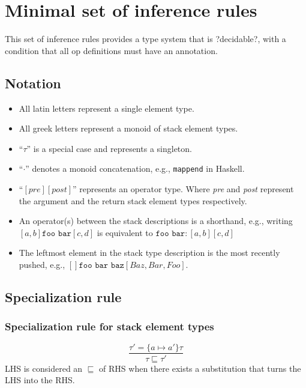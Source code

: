 \documentclass{article}
\newcommand{\op}[3]{[#1] \texttt{#2} [#3]}
\begin{document}
\section*{Minimal set of inference rules}
This set of inference rules provides a type system that is ?decidable?,
with a condition that all op definitions must have an annotation.

\subsection*{Notation}

\begin{itemize}
\item All latin letters represent a single element type.
\item All greek letters represent a monoid of stack element types.
\item ``$\tau$'' is a special case and represents a singleton.
\item ``$\cdot$'' denotes a monoid concatenation, e.g.,
  \texttt{mappend} in Haskell.
\item ``$\op{\textit{pre}}{}{\textit{post}}$'' represents an operator
  type. Where \textit{pre} and \textit{post} represent the argument
  and the return stack element types respectively.
\item An operator(s) between the stack descriptions is a shorthand,
  e.g., writing $\op{a, b}{foo bar}{c, d}$ is equivalent to
  $\texttt{foo bar} : \op{a, b}{}{c, d}$
\item The leftmost element in the stack type description is the most
  recently pushed, e.g., $\op{}{foo bar baz}{Baz, Bar, Foo}$.
\end{itemize}


\subsection*{Specialization rule}

\subsubsection*{Specialization rule for stack element types}

\begin{equation*}
  \tag{Spec}
  \frac{
    \tau' = \{ a \mapsto a' \} \tau
  }{
    \tau \sqsubseteq \tau'
  }
\end{equation*}
LHS is considered an $\sqsubseteq$ of RHS when there exists a substitution
that turns the LHS into the RHS.
\end{document}
